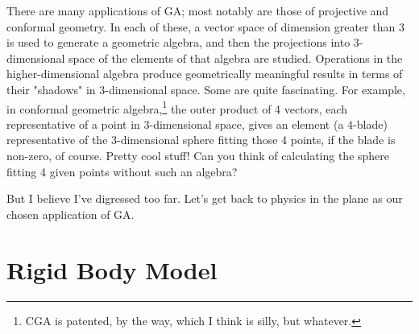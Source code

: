 \documentclass[12pt]{article}
\begin{document}
There are many applications of GA; most notably are those of projective and conformal geometry.
In each of these, a vector space of dimension greater than 3 is used to generate a geometric
algebra, and then the projections into 3-dimensional space of the elements of that algebra are studied.
Operations in the higher-dimensional algebra produce geometrically meaningful results in terms of their
"shadows" in 3-dimensional space.  Some are quite fascinating.  For example, in conformal geometric
algebra,\footnote{CGA is patented, by the way, which I think is silly, but whatever.} the outer
product of 4 vectors, each representative of a point in 3-dimensional space, gives an element (a $4$-blade)
representative of the 3-dimensional sphere fitting those 4 points, if the blade is non-zero, of course.
Pretty cool stuff!  Can you think of calculating the sphere fitting 4 given points without such an algebra?

But I believe I've digressed too far.  Let's get back to physics in the plane as
our chosen application of GA.

\section{Rigid Body Model}
\end{document}
